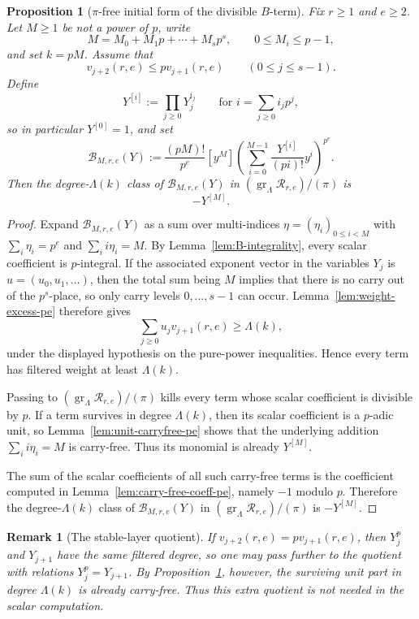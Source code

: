 \documentclass[11pt]{amsart}
\numberwithin{equation}{section}
\newtheorem{proposition}[proposition]{Proposition}
\newtheorem{remark}[remark]{Remark}
\newcommand{\gr}{\operatorname{gr}}
\begin{document}
\begin{proposition}[$\pi$-free initial form of the divisible $B$-term]\label{prop:initial-form-B-pe}
Fix $r\ge1$ and $e\ge2$.  Let $M\ge1$ be not a power of $p$, write
\[
        M=M_0+M_1p+\cdots+M_sp^s,
        \qquad
        0\le M_i\le p-1,
\]
and set $k=pM$.  Assume that
\[
        v_{j+2}(r,e)\le pv_{j+1}(r,e)
        \qquad (0\le j\le s-1).
\]
Define
\[
        Y^{[i]}:=\prod_{j\ge0}Y_j^{i_j}
        \qquad\text{for }i=\sum_{j\ge0} i_jp^j,
\]
so in particular $Y^{[0]}=1$, and set
\[
        \mathcal B_{M,r,e}(Y):=\frac{(pM)!}{p^e}[y^M]
        \left(\sum_{i=0}^{M-1}\frac{Y^{[i]}}{(pi)!}y^i\right)^{p^e}.
\]
Then the degree-$\Lambda(k)$ class of $\mathcal B_{M,r,e}(Y)$ in
$(\gr_\Lambda\mathcal R_{r,e})/(\pi)$ is
\[
        -Y^{[M]}.
\]
\end{proposition}
\begin{proof}
Expand $\mathcal B_{M,r,e}(Y)$ as a sum over multi-indices $\eta=(\eta_i)_{0\le i<M}$ with $\sum_i\eta_i=p^e$ and $\sum_i i\eta_i=M$.  By Lemma~\ref{lem:B-integrality}, every scalar coefficient is $p$-integral.  If the associated exponent vector in the variables $Y_j$ is $u=(u_0,u_1,\ldots)$, then the total sum being $M$ implies that there is no carry out of the $p^s$-place, so only carry levels $0,\ldots,s-1$ can occur.  Lemma~\ref{lem:weight-excess-pe} therefore gives
\[
        \sum_{j\ge0}u_jv_{j+1}(r,e)\ge \Lambda(k),
\]
under the displayed hypothesis on the pure-power inequalities.  Hence every term has filtered weight at least $\Lambda(k)$.

Passing to $(\gr_\Lambda\mathcal R_{r,e})/(\pi)$ kills every term whose scalar coefficient is divisible by $p$.  If a term survives in degree $\Lambda(k)$, then its scalar coefficient is a $p$-adic unit, so Lemma~\ref{lem:unit-carryfree-pe} shows that the underlying addition $\sum_i i\eta_i=M$ is carry-free.  Thus its monomial is already $Y^{[M]}$.

The sum of the scalar coefficients of all such carry-free terms is the coefficient computed in Lemma~\ref{lem:carry-free-coeff-pe}, namely $-1$ modulo $p$.  Therefore the degree-$\Lambda(k)$ class of $\mathcal B_{M,r,e}(Y)$ in $(\gr_\Lambda\mathcal R_{r,e})/(\pi)$ is $-Y^{[M]}$.
\end{proof}

\begin{remark}[The stable-layer quotient]\label{rem:stable-quotient-pe}
If $v_{j+2}(r,e)=pv_{j+1}(r,e)$, then $Y_j^p$ and $Y_{j+1}$ have the same filtered degree, so one may pass further to the quotient with relations $Y_j^p=Y_{j+1}$.  By Proposition~\ref{prop:initial-form-B-pe}, however, the surviving unit part in degree $\Lambda(k)$ is already carry-free.  Thus this extra quotient is not needed in the scalar computation.
\end{remark}
\end{document}
